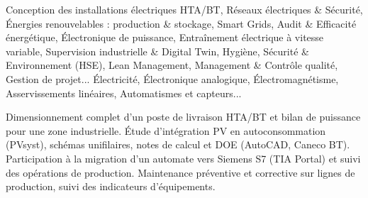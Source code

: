 \documentclass[10pt,a4paper]{../altacv}
\begin{document}
\cvidentite
{}
\makecvheader

\cvformation
{Conception des installations électriques HTA/BT, Réseaux électriques \& Sécurité, Énergies renouvelables : production \& stockage, Smart Grids, Audit \& Efficacité énergétique, Électronique de puissance, Entraînement électrique à vitesse variable, Supervision industrielle \& Digital Twin, Hygiène, Sécurité \& Environnement (HSE), Lean Management, Management \& Contrôle qualité, Gestion de projet...}
{Électricité, Électronique analogique, Électromagnétisme, Asservissements linéaires, Automatismes et capteurs...}

\expcore
{Dimensionnement complet d’un poste de livraison HTA/BT et bilan de puissance pour une zone industrielle.}
{Étude d’intégration PV en autoconsommation (PVsyst), schémas unifilaires, notes de calcul et DOE (AutoCAD, Caneco BT).}
\vspace{2pt}
\expmenara
{Participation à la migration d’un automate vers Siemens S7 (TIA Portal) et suivi des opérations de production.}
{Maintenance préventive et corrective sur lignes de production, suivi des indicateurs d’équipements.}
\end{document}
